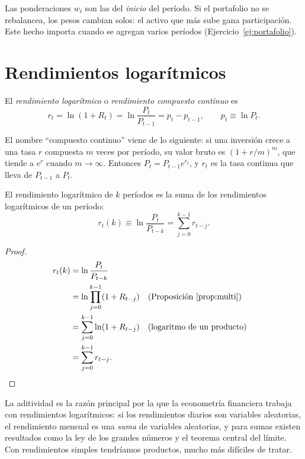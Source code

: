 \begin{observacion}
Las ponderaciones $w_i$ son las del \emph{inicio} del período. Si el portafolio no se rebalancea, los
pesos cambian solos: el activo que más sube gana participación. Este hecho importa cuando se agregan
varios períodos (Ejercicio~\ref{ej:portafolio}).
\end{observacion}

\section{Rendimientos logarítmicos}

\begin{definicion}
El \emph{rendimiento logarítmico} o \emph{rendimiento compuesto continuo} es
\[
  r_t=\ln(1+R_t)=\ln\frac{P_t}{P_{t-1}}=p_t-p_{t-1},\qquad p_t\equiv\ln P_t .
\]
\end{definicion}

El nombre ``compuesto continuo'' viene de lo siguiente: si una inversión crece a una tasa $r$ compuesta
$m$ veces por período, su valor bruto es $(1+r/m)^m$, que tiende a $e^{r}$ cuando $m\to\infty$. Entonces
$P_t=P_{t-1}e^{r_t}$, y $r_t$ es la tasa continua que lleva de $P_{t-1}$ a $P_t$.

\begin{proposicion}\label{prop:aditiva}
El rendimiento logarítmico de $k$ períodos es la suma de los rendimientos logarítmicos de un período:
\[
  r_t(k)\equiv\ln\frac{P_t}{P_{t-k}}=\sum_{j=0}^{k-1}r_{t-j}.
\]
\end{proposicion}

\begin{proof}
\begin{align*}
  r_t(k) &= \ln\frac{P_t}{P_{t-k}}\\
         &= \ln\prod_{j=0}^{k-1}(1+R_{t-j}) && \text{(Proposición~\ref{prop:multi})}\\
         &= \sum_{j=0}^{k-1}\ln(1+R_{t-j}) && \text{(logaritmo de un producto)}\\
         &= \sum_{j=0}^{k-1}r_{t-j}. && \qedhere
\end{align*}
\end{proof}

La aditividad es la razón principal por la que la econometría financiera trabaja con rendimientos
logarítmicos: si los rendimientos diarios son variables aleatorias, el rendimiento mensual es una
\emph{suma} de variables aleatorias, y para sumas existen resultados como la ley de los grandes números
y el teorema central del límite. Con rendimientos simples tendríamos productos, mucho más difíciles de
tratar.

